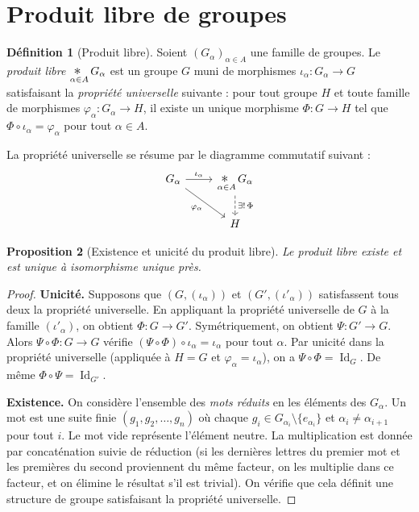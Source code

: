 \documentclass[12pt,a4paper,openany]{book}
\theoremstyle{definition}
\newtheorem{definition}{Définition}[chapter]
\theoremstyle{plain}
\newtheorem{proposition}[definition]{Proposition}
\theoremstyle{remark}
\DeclareMathOperator{\Id}{Id}
\begin{document}
\section{Produit libre de groupes}\label{sec:produit-libre}

\begin{definition}[Produit libre]\label{def:produit-libre}
Soient $(G_\alpha)_{\alpha \in A}$ une famille de groupes. Le \emph{produit libre}
$\displaystyle\mathop{\scalebox{1.3}{$\ast$}}_{\alpha \in A} G_\alpha$ est un groupe $G$ muni
de morphismes $\iota_\alpha \colon G_\alpha \to G$ satisfaisant la \emph{propriété universelle}
suivante : pour tout groupe $H$ et toute famille de morphismes $\varphi_\alpha \colon G_\alpha \to H$,
il existe un unique morphisme $\Phi \colon G \to H$ tel que $\Phi \circ \iota_\alpha = \varphi_\alpha$
pour tout $\alpha \in A$.
\end{definition}

La propriété universelle se résume par le diagramme commutatif suivant :
\[
\begin{tikzcd}
G_\alpha \arrow[r, "\iota_\alpha"] \arrow[dr, "\varphi_\alpha"'] & \displaystyle\mathop{\scalebox{1.3}{$\ast$}}_{\alpha \in A} G_\alpha \arrow[d, dashed, "\exists!\,\Phi"] \\
& H
\end{tikzcd}
\]

\begin{proposition}[Existence et unicité du produit libre]\label{prop:existence-produit-libre}
Le produit libre existe et est unique à isomorphisme unique près.
\end{proposition}

\begin{proof}
\textbf{Unicité.} Supposons que $(G, (\iota_\alpha))$ et $(G', (\iota'_\alpha))$
satisfassent tous deux la propriété universelle. En appliquant la propriété universelle de $G$
à la famille $(\iota'_\alpha)$, on obtient $\Phi \colon G \to G'$. Symétriquement, on obtient
$\Psi \colon G' \to G$. Alors $\Psi \circ \Phi \colon G \to G$ vérifie
$(\Psi \circ \Phi) \circ \iota_\alpha = \iota_\alpha$ pour tout $\alpha$. Par unicité dans
la propriété universelle (appliquée à $H = G$ et $\varphi_\alpha = \iota_\alpha$), on a
$\Psi \circ \Phi = \Id_G$. De même $\Phi \circ \Psi = \Id_{G'}$.

\textbf{Existence.} On considère l'ensemble des \emph{mots réduits}
en les éléments des $G_\alpha$. Un mot est une suite finie
$(g_1, g_2, \ldots, g_n)$ où chaque $g_i \in G_{\alpha_i} \setminus \{e_{\alpha_i}\}$
et $\alpha_i \neq \alpha_{i+1}$ pour tout $i$. Le mot vide représente l'élément neutre.
La multiplication est donnée par concaténation suivie de réduction (si les dernières lettres
du premier mot et les premières du second proviennent du même facteur, on les multiplie dans
ce facteur, et on élimine le résultat s'il est trivial). On vérifie que cela définit une
structure de groupe satisfaisant la propriété universelle.
\end{proof}
\end{document}
